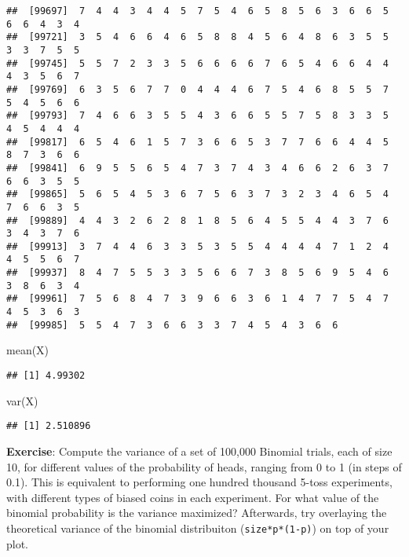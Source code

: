 \documentclass[
]{book}
\newenvironment{Shaded}{\begin{snugshade}}{\end{snugshade}}
\newcommand{\FunctionTok}[1]{\textcolor[rgb]{0.00,0.00,0.00}{#1}}
\newcommand{\NormalTok}[1]{#1}
\begin{document}
\begin{verbatim}
##  [99697]  7  4  4  3  4  4  5  7  5  4  6  5  8  5  6  3  6  6  5  6  6  4  3  4
##  [99721]  3  5  4  6  6  4  6  5  8  8  4  5  6  4  8  6  3  5  5  3  3  7  5  5
##  [99745]  5  5  7  2  3  3  5  6  6  6  6  7  6  5  4  6  6  4  4  4  3  5  6  7
##  [99769]  6  3  5  6  7  7  0  4  4  4  6  7  5  4  6  8  5  5  7  5  4  5  6  6
##  [99793]  7  4  6  6  3  5  5  4  3  6  6  5  5  7  5  8  3  3  5  4  5  4  4  4
##  [99817]  6  5  4  6  1  5  7  3  6  6  5  3  7  7  6  6  4  4  5  8  7  3  6  6
##  [99841]  6  9  5  5  6  5  4  7  3  7  4  3  4  6  6  2  6  3  7  6  6  3  5  5
##  [99865]  5  6  5  4  5  3  6  7  5  6  3  7  3  2  3  4  6  5  4  7  6  6  3  5
##  [99889]  4  4  3  2  6  2  8  1  8  5  6  4  5  5  4  4  3  7  6  3  4  3  7  6
##  [99913]  3  7  4  4  6  3  3  5  3  5  5  4  4  4  4  7  1  2  4  4  5  5  6  7
##  [99937]  8  4  7  5  5  3  3  5  6  6  7  3  8  5  6  9  5  4  6  3  8  6  3  4
##  [99961]  7  5  6  8  4  7  3  9  6  6  3  6  1  4  7  7  5  4  7  4  5  3  6  3
##  [99985]  5  5  4  7  3  6  6  3  3  7  4  5  4  3  6  6
\end{verbatim}

\begin{Shaded}
\begin{Highlighting}[]
\FunctionTok{mean}\NormalTok{(X)}
\end{Highlighting}
\end{Shaded}

\begin{verbatim}
## [1] 4.99302
\end{verbatim}

\begin{Shaded}
\begin{Highlighting}[]
\FunctionTok{var}\NormalTok{(X)}
\end{Highlighting}
\end{Shaded}

\begin{verbatim}
## [1] 2.510896
\end{verbatim}

\textbf{Exercise}: Compute the variance of a set of 100,000 Binomial trials, each of size 10, for different values of the probability of heads, ranging from 0 to 1 (in steps of 0.1). This is equivalent to performing one hundred thousand 5-toss experiments, with different types of biased coins in each experiment. For what value of the binomial probability is the variance maximized? Afterwards, try overlaying the theoretical variance of the binomial distribuiton (\texttt{size*p*(1-p)}) on top of your plot.
\end{document}
